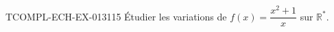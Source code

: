 \begin{exercice}{TCOMPL-ECH-EX-013}{1}{15}
Étudier les variations de $f(x) = \dfrac{x^2+1}{x}$ sur $\mathbb{R}^*$.

\end{exercice}
